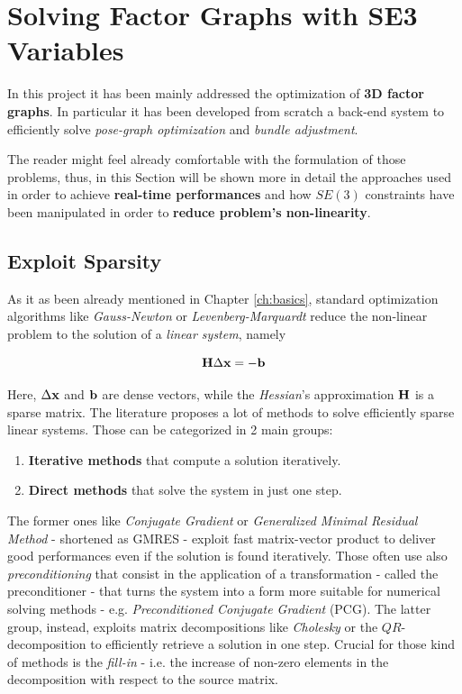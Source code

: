 \chapter{Solving Factor Graphs with SE3 Variables}\label{ch:solvingSE3}

In this project it has been mainly addressed the optimization of \textbf{3D factor graphs}. In particular it has been developed from scratch a back-end system to efficiently solve \textit{pose-graph optimization} and \textit{bundle adjustment}.

The reader might feel already comfortable with the formulation of those problems, thus, in this Section will be shown more in detail the approaches used in order to achieve \textbf{real-time performances} and how $SE(3)$ constraints have been manipulated in order to \textbf{reduce problem's non-linearity}. 

\section{Exploit Sparsity}\label{sec:sparsity}
As it as been already mentioned in Chapter \ref{ch:basics}, standard optimization algorithms like \textit{Gauss-Newton} or \textit{Levenberg-Marquardt} reduce the non-linear problem to the solution of a \textit{linear system}, namely

\begin{equation*}
    \mathbf{H} \Delta \mathbf{x} = -\mathbf{b}
\end{equation*}

\noindent Here, $\Delta \mathbf{x}$ and $\mathbf{b}$ are dense vectors, while the \textit{Hessian}'s approximation $\mathbf{H}$ is a sparse matrix. The literature proposes a lot of methods to solve efficiently sparse linear systems. Those can be categorized in 2 main groups:

\begin{enumerate}
    \item \textbf{Iterative methods} \cite{saad2003iterativeSPsolvers} that compute a solution iteratively.
    \item \textbf{Direct methods} \cite{davis2006directSPsolvers} that solve the system in just one step.
\end{enumerate}

\noindent The former ones like \textit{Conjugate Gradient} or \textit{Generalized Minimal Residual Method} - shortened as GMRES - exploit fast matrix-vector product to deliver good performances even if the solution is found iteratively. Those often use also \textit{preconditioning} that consist in the application of a transformation - called the preconditioner - that turns the system into a form more suitable for numerical solving methods - e.g. \textit{Preconditioned Conjugate Gradient} (PCG). The latter group, instead, exploits matrix decompositions like \textit{Cholesky} or the $QR$-decomposition to efficiently retrieve a solution in one step. Crucial for those kind of methods is the \textit{fill-in} - i.e. the increase of non-zero elements in the decomposition with respect to the source matrix. 

